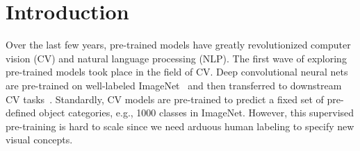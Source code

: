 \section{Introduction}

Over the last few years, pre-trained models have greatly revolutionized computer vision (CV) and natural language processing (NLP). 
The first wave of exploring pre-trained models took place in the field of CV. Deep convolutional neural nets~\citep{krizhevsky2012imagenet, simonyan2014very, he2016deep} are pre-trained on well-labeled  ImageNet~\citep{deng2009imagenet} and then transferred to downstream CV tasks~\citep{girshick2014rich, long2015fully, vinyals2015show}.
Standardly, CV models are pre-trained to predict a fixed set of pre-defined object categories, e.g., 1000 classes in ImageNet.
However, this supervised pre-training is hard to scale since we need arduous human labeling to specify new visual concepts.

